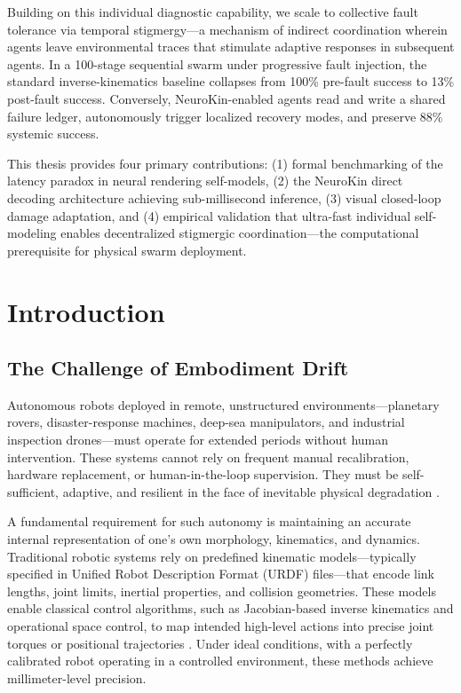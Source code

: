 \documentclass[12pt,a4paper,oneside]{report}
\begin{document}
Building on this individual diagnostic capability, we scale to collective fault tolerance via temporal stigmergy—a mechanism of indirect coordination wherein agents leave environmental traces that stimulate adaptive responses in subsequent agents. In a 100-stage sequential swarm under progressive fault injection, the standard inverse-kinematics baseline collapses from 100\% pre-fault success to 13\% post-fault success. Conversely, NeuroKin-enabled agents read and write a shared failure ledger, autonomously trigger localized recovery modes, and preserve 88\% systemic success.

This thesis provides four primary contributions: (1) formal benchmarking of the latency paradox in neural rendering self-models, (2) the NeuroKin direct decoding architecture achieving sub-millisecond inference, (3) visual closed-loop damage adaptation, and (4) empirical validation that ultra-fast individual self-modeling enables decentralized stigmergic coordination—the computational prerequisite for physical swarm deployment.

\clearpage

\tableofcontents
\clearpage
\listoffigures
{}
\clearpage
\listoftables
{}
\clearpage


\chapter{Introduction}

\section{The Challenge of Embodiment Drift}

Autonomous robots deployed in remote, unstructured environments—planetary rovers, disaster-response machines, deep-sea manipulators, and industrial inspection drones—must operate for extended periods without human intervention. These systems cannot rely on frequent manual recalibration, hardware replacement, or human-in-the-loop supervision. They must be self-sufficient, adaptive, and resilient in the face of inevitable physical degradation \cite{bongard2006resilient, cully2015robots}.

A fundamental requirement for such autonomy is maintaining an accurate internal representation of one's own morphology, kinematics, and dynamics. Traditional robotic systems rely on predefined kinematic models—typically specified in Unified Robot Description Format (URDF) files—that encode link lengths, joint limits, inertial properties, and collision geometries. These models enable classical control algorithms, such as Jacobian-based inverse kinematics and operational space control, to map intended high-level actions into precise joint torques or positional trajectories \cite{siciliano2009robotics}. Under ideal conditions, with a perfectly calibrated robot operating in a controlled environment, these methods achieve millimeter-level precision.
\end{document}
